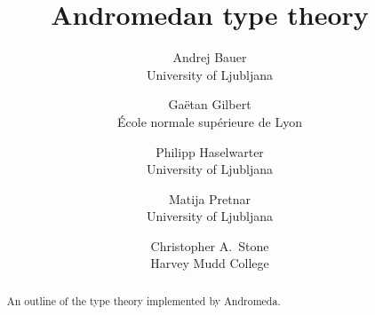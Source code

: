 \documentclass{article}
\begin{document}
\title{Andromedan type theory}
\author{
Andrej Bauer \\ University of Ljubljana
\and
Gaëtan Gilbert \\ École normale supérieure de Lyon
\and
Philipp Haselwarter \\ University of Ljubljana
\and
Matija Pretnar \\ University of Ljubljana
\and
Christopher A.~Stone \\ Harvey Mudd College}

\maketitle

\begin{abstract}
  An outline of the type theory implemented by Andromeda.
\end{abstract}




\end{document}

